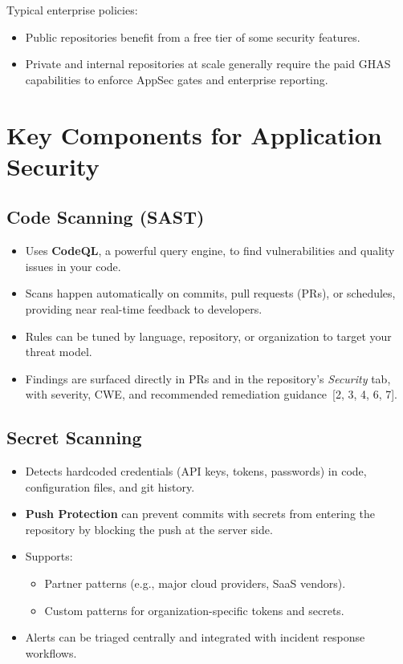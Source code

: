 \documentclass[11pt]{article}
\begin{document}
Typical enterprise policies:

\begin{itemize}[leftmargin=*]
  \item Public repositories benefit from a free tier of some security features.
  \item Private and internal repositories at scale generally require the paid GHAS capabilities to enforce AppSec gates and enterprise reporting.
\end{itemize}

\section{Key Components for Application Security}

\subsection{Code Scanning (SAST)}

\begin{itemize}[leftmargin=*]
  \item Uses \textbf{CodeQL}, a powerful query engine, to find vulnerabilities and quality issues in your code.
  \item Scans happen automatically on commits, pull requests (PRs), or schedules, providing near real-time feedback to developers.
  \item Rules can be tuned by language, repository, or organization to target your threat model.
  \item Findings are surfaced directly in PRs and in the repository's \emph{Security} tab, with severity, CWE, and recommended remediation guidance~[2, 3, 4, 6, 7].
\end{itemize}

\subsection{Secret Scanning}

\begin{itemize}[leftmargin=*]
  \item Detects hardcoded credentials (API keys, tokens, passwords) in code, configuration files, and git history.
  \item \textbf{Push Protection} can prevent commits with secrets from entering the repository by blocking the push at the server side.
  \item Supports:
    \begin{itemize}
      \item Partner patterns (e.g., major cloud providers, SaaS vendors).
      \item Custom patterns for organization-specific tokens and secrets.
    \end{itemize}
  \item Alerts can be triaged centrally and integrated with incident response workflows.
\end{itemize}
\end{document}
